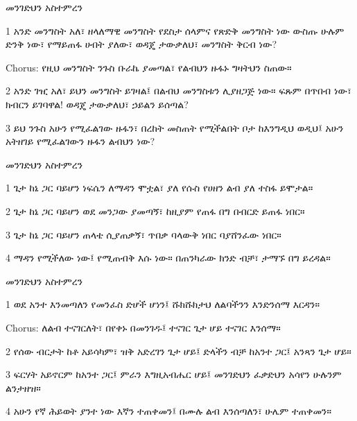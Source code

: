 \documentclass[12pt]{article}
\begin{document}
\begin{hymn}{4}{መንገድህን አስተምረን}
\begin{stanza}
1 አንድ መንግስት አለ፣ ዘላለማዊ መንግስት
የደስታ ሰላምና የጽድቅ መንግስት ነው
ውስጡ ሁሉም ድንቅ ነው፣ የማይጠፋ ሀብት ያለው፣
ወዳጄ ታውቃለህ፣ መንግስት ቅርብ ነው?
\end{stanza}
\begin{chorus}
Chorus: የዚህ መንግስት ንጉስ
ቡራኬ ያመጣል፣
የልብህን ዙፋኑ
ግዛትህን ስጠው።
\end{chorus}
\begin{stanza}
2 አንድ ገዢ አለ፣ ይህን መንግስት ይገዛል፤
በልብህ መንግስቱን ሊያዘጋጅ ነው።
ፍጹም በጥበብ ነው፣ ክብርን ይገባዋል!
ወዳጄ ታውቃለህ፣ ኃይልን ይሰጣል?
\end{stanza}
\begin{stanza}
3 ይህ ንጉስ አሁን የሚፈልገው ዙፋን፣
በረከት መስጠት የሚችልበት ቦታ
ከእንግዲህ ወዲህ፤ አሁን አትዘገይ
የሚፈልገውን ዙፋን ልብህን ነው?
\end{stanza}
\end{hymn}

\begin{hymn}{4}{መንገድህን አስተምረን}
\begin{stanza}
1 ጌታ ከኔ ጋር ባይሆን
ነፍሴን ለማዳን ሞቷል፣
ያለ የሱስ የሀዘን ልብ
ያለ ተስፋ ይሞታል።
\end{stanza}
\begin{stanza}
2 ጌታ ከኔ ጋር ባይሆን
ወደ መንጋው ያመጣኝ፣
ከዚያም የጠፋ በግ
በብርድ ይጠፋ ነበር።
\end{stanza}
\begin{stanza}
3 ጌታ ከኔ ጋር ባይሆን
ጠላቴ ሲያጠቃኝ፣
ጥበቃ ባላውቅ ነበር
ባያሸንፈው ነበር።
\end{stanza}
\begin{stanza}
4 ማዳን የሚችለው ነው፤
የሚጠብቅ እሱ ነው።
በጠንካራው ክንድ ብቻ፣
ታማኙ በግ ይረዳል።
\end{stanza}
\end{hymn}

\begin{hymn}{4}{መንገድህን አስተምረን}
\begin{stanza}
1 ወደ አንተ እንመጣለን
የመንፈስ ድሆች ሆነን፤
ሹክሹክታህ ለልባችንን
እንድንሰማ እርዳን።
\end{stanza}
\begin{chorus}
Chorus: ለልብ ተናገርለት፣
በየቀኑ በመንገዱ፤
ተናገር ጌታ ሆይ
ተናገር እንሰማ።
\end{chorus}
\begin{stanza}
2 የሰው ብርታት ከቶ አይሳካም፣
ዝቅ አድረገን ጌታ ሆይ፤
ድላችን ብቻ ከአንተ ጋር፤
አንጻን ጌታ ሆይ።
\end{stanza}
\begin{stanza}
3 ፍርሃት አይኖርም ከአንተ ጋር፤
ምራን እግዚአብሔር ሆይ፤
መንገድህን ፈቃድህን አሳየን
ሁሉንም ልንታዘዝ።
\end{stanza}
\begin{stanza}
4 አሁን የኛ ሕይወት ያንተ ነው
እኛን ተጠቀመን፤
በሙሉ ልብ እንሰጣለን፣
ሁሌም ተጠቀመን።
\end{stanza}
\end{hymn}
\end{document}
